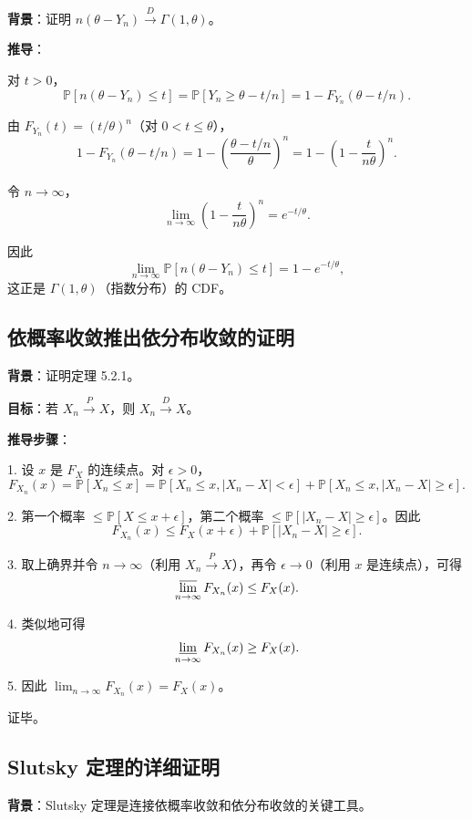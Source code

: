\textbf{背景}：证明 $n(\theta - Y_n) \xrightarrow{D} \Gamma(1, \theta)$。

\textbf{推导}：

对 $t > 0$，
\[
\mathbb{P}[n(\theta - Y_n) \leq t] = \mathbb{P}[Y_n \geq \theta - t/n] = 1 - F_{Y_n}(\theta - t/n).
\]

由 $F_{Y_n}(t) = (t/\theta)^n$（对 $0 < t \leq \theta$），
\[
1 - F_{Y_n}(\theta - t/n) = 1 - \left(\frac{\theta - t/n}{\theta}\right)^n = 1 - \left(1 - \frac{t}{n\theta}\right)^n.
\]

令 $n \to \infty$，
\[
\lim_{n \to \infty} \left(1 - \frac{t}{n\theta}\right)^n = e^{-t/\theta}.
\]

因此
\[
\lim_{n \to \infty} \mathbb{P}[n(\theta - Y_n) \leq t] = 1 - e^{-t/\theta},
\]
这正是 $\Gamma(1, \theta)$（指数分布）的 CDF。

\subsection{依概率收敛推出依分布收敛的证明}\label{sec:prob-to-dist-proof}

\textbf{背景}：证明定理 5.2.1。

\textbf{目标}：若 $X_n \xrightarrow{P} X$，则 $X_n \xrightarrow{D} X$。

\textbf{推导步骤}：

1. 设 $x$ 是 $F_X$ 的连续点。对 $\epsilon > 0$，
\[
F_{X_n}(x) = \mathbb{P}[X_n \leq x] = \mathbb{P}[X_n \leq x, |X_n - X| < \epsilon] + \mathbb{P}[X_n \leq x, |X_n - X| \geq \epsilon].
\]

2. 第一个概率 $\leq \mathbb{P}[X \leq x + \epsilon]$，第二个概率 $\leq \mathbb{P}[|X_n - X| \geq \epsilon]$。因此
\[
F_{X_n}(x) \leq F_X(x + \epsilon) + \mathbb{P}[|X_n - X| \geq \epsilon].
\]

3. 取上确界并令 $n \to \infty$（利用 $X_n \xrightarrow{P} X$），再令 $\epsilon \to 0$（利用 $x$ 是连续点），可得
\[
\varlimsup_{n \to \infty} F_{X_n}(x) \leq F_X(x).
\]

4. 类似地可得
\[
\varliminf_{n \to \infty} F_{X_n}(x) \geq F_X(x).
\]

5. 因此 $\lim_{n \to \infty} F_{X_n}(x) = F_X(x)$。

证毕。

\subsection{Slutsky 定理的详细证明}\label{sec:slutsky-proof}

\textbf{背景}：Slutsky 定理是连接依概率收敛和依分布收敛的关键工具。

